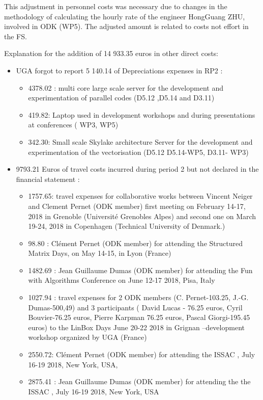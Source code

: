 This adjustment in personnel costs was necessary due to changes in the methodology of calculating the hourly rate of the engineer HongGuang ZHU, involved in ODK (WP5). The adjusted amount is related to costs not effort in the FS.

 Explanation for the addition of 14 933.35 euros in other direct costs:
 
 \begin{itemize}
\item UGA forgot to report 5 140.14 of Depreciations expenses in RP2 : 
  \begin{itemize}
\item 4378.02 : multi core large scale server for the development and experimentation of parallel codes (D5.12 ,D5.14 and D3.11)
\item 419.82: Laptop used in  development workshops and during presentations at conferences ( WP3, WP5) 
\item 342.30: Small scale Skylake architecture Server for the development and experimentation of the vectorisation (D5.12 D5.14-WP5, D3.11- WP3)
\end{itemize}

\item 9793.21 Euros of travel costs incurred during period 2 but not declared in the financial statement :
  \begin{itemize} 
 \item 1757.65: travel expenses  for collaborative works between Vincent Neiger and Clement Pernet (ODK member) first meeting on February 14-17, 2018 in Grenoble (Université Grenobles Alpes) and second one on March 19-24, 2018 in Copenhagen (Technical University of Denmark.)
\item 98.80 : Clément Pernet (ODK member) for attending the Structured Matrix Days, on May 14-15, in Lyon (France)
\item 1482.69 : Jean Guillaume Dumas (ODK member) for attending the Fun with Algorithms Conference on June 12-17 2018, Pisa, Italy
\item 1027.94 : travel expenses for 2 ODK members (C. Pernet-103.25, J.-G. Dumas-500,49) and 3 participants ( David Lucas - 76.25 euros, Cyril Bouvier-76.25 euros, Pierre Karpman 76.25 euros, Pascal Giorgi-195.45 euros) to the LinBox Days June 20-22 2018 in Grignan –development workshop organized by UGA (France)
\item 2550.72: Clément Pernet (ODK member) for attending the ISSAC , July 16-19 2018, New York, USA,
\item 2875.41 : Jean Guillaume Dumas (ODK member) for attending the the ISSAC , July 16-19 2018, New York, USA
\end{itemize}


\end{itemize}
